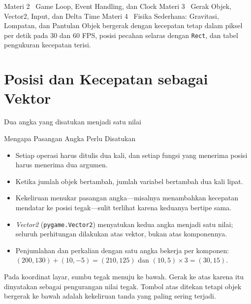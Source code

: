 \documentclass[aspectratio=169,10pt]{beamer}
\begin{document}
  {Materi 2 \textperiodcentered\ Game Loop, Event Handling, dan Clock}
  {Materi 3 \textperiodcentered\ Gerak Objek, Vector2, Input, dan Delta Time}
  {Materi 4 \textperiodcentered\ Fisika Sederhana: Gravitasi, Lompatan, dan
   Pantulan}
  {Objek bergerak dengan kecepatan tetap dalam piksel per detik pada 30 dan
   60 FPS, posisi pecahan selaras dengan \texttt{Rect}, dan tabel pengukuran
   kecepatan terisi.}

\section{Posisi dan Kecepatan sebagai Vektor}
  {Dua angka yang disatukan menjadi satu nilai}

\begin{frame}{Mengapa Pasangan Angka Perlu Disatukan}
\begin{itemize}
  \item Setiap operasi harus ditulis dua kali, dan setiap fungsi yang menerima
        posisi harus menerima dua argumen.
  \item Ketika jumlah objek bertambah, jumlah variabel bertambah dua kali
        lipat.
  \item Kekeliruan menukar pasangan angka---misalnya menambahkan kecepatan
        mendatar ke posisi tegak---sulit terlihat karena keduanya bertipe sama.
  \item \emph{Vector2} (\texttt{pygame.Vector2}) menyatukan kedua angka menjadi
        satu nilai; seluruh perhitungan dilakukan atas vektor, bukan atas
        komponennya.
  \item Penjumlahan dan perkalian dengan satu angka bekerja per komponen:
        $(200, 130) + (10, -5) = (210, 125)$ dan $(10, 5) \times 3 = (30, 15)$.
\end{itemize}
\vspace{0.16cm}
\begin{kotak}
Pada koordinat layar, sumbu tegak menuju ke bawah. Gerak ke atas karena itu
dinyatakan sebagai pengurangan nilai tegak. Tombol atas ditekan tetapi objek
bergerak ke bawah adalah kekeliruan tanda yang paling sering terjadi.
\end{kotak}
\end{frame}
\end{document}
